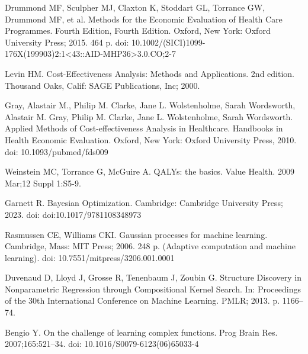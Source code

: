 \documentclass{IOS-Book-Article}
\begin{document}
	\begin{thebibliography}{99}
		
		Drummond MF, Sculpher MJ, Claxton K, Stoddart GL, Torrance GW, Drummond MF, et al. Methods for the Economic Evaluation of Health Care Programmes. Fourth Edition, Fourth Edition. Oxford, New York: Oxford University Press; 2015. 464 p. doi: 10.1002/(SICI)1099-176X(199903)2:1<43::AID-MHP36>3.0.CO;2-7
				
		Levin HM. Cost-Effectiveness Analysis: Methods and Applications. 2nd edition. Thousand Oaks, Calif: SAGE Publications, Inc; 2000.
		
		Gray, Alastair M., Philip M. Clarke, Jane L. Wolstenholme, Sarah Wordsworth, Alastair M. Gray, Philip M. Clarke, Jane L. Wolstenholme, Sarah Wordsworth. Applied Methods of Cost-effectiveness Analysis in Healthcare. Handbooks in Health Economic Evaluation. Oxford, New York: Oxford University Press, 2010. doi: 10.1093/pubmed/fds009
		
		Weinstein MC, Torrance G, McGuire A. QALYs: the basics. Value Health. 2009 Mar;12 Suppl 1:S5-9. 

				
		Garnett R. Bayesian Optimization. Cambridge: Cambridge University Press; 2023. doi: doi:10.1017/9781108348973
				
		Rasmussen CE, Williams CKI. Gaussian processes for machine learning. Cambridge, Mass: MIT Press; 2006. 248 p. (Adaptive computation and machine learning). doi: 10.7551/mitpress/3206.001.0001
		
		Duvenaud D, Lloyd J, Grosse R, Tenenbaum J, Zoubin G. Structure Discovery in Nonparametric Regression through Compositional Kernel Search. In: Proceedings of the 30th International Conference on Machine Learning. PMLR; 2013. p. 1166–74.
		
		Bengio Y. On the challenge of learning complex functions. Prog Brain Res. 2007;165:521–34. doi: 10.1016/S0079-6123(06)65033-4 
		

\end{thebibliography}
\end{document}
